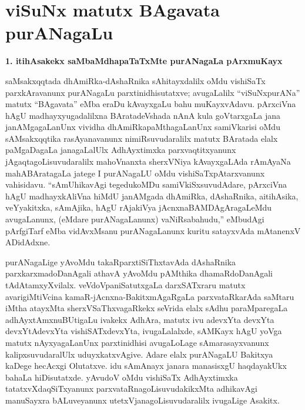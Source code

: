 \makeatletter
\def\@makechapterhead#1{%
  \vspace*{10\p@}%
{\fontsize{13pt}{13pt}\selectfont\raggedright{\bf  e. ke. bAyxnajiR}\par}
\vspace*{25\p@}%
  {\parindent \z@ \centering \normalfont
    \ifnum \c@secnumdepth >\m@ne
      \if@mainmatter
        {\huge\bfseries  #1}\par\nobreak
	\vskip 4pt
      \fi
    \fi
\smallskip 

 \vskip 10\p@  
{\fontsize{12pt}{12pt}\selectfont\raggedleft{anu: \bf pu.ti.na.}\par}
  }
\vskip 40\p@}
\makeatother

\chapter{viSuNx matutx BAgavata purANagaLu}\label{chap005}

\begin{center}
{\Large\bf 1. itihAsakekx saMbaMdhapaTaTxMte purANagaLa pArxmuKayx}
\end{center}

saMsakxqqtada dhAmiRka-dAshaRnika sAhitayxdalilx oMdu vishiSaTx parxkAravanunx purANa\-gaLu parxtinidhisutatxve; avugaLalilx ``viSuNxpurANa'' matutx ``BAgavata'' eMba eraDu kAvayx\-gaLu bahu muKayxvAdavu. pArxciVna hAgU madhayxyugadalilxna BAratadeVshada nAnA kula goVtarxgaLa jana janAMgagaLanUnx vividha dhAmiRkapaMthagaLanUnx samiVkarisi oMdu sAMsakxqqtika rasAyanavanunx nimiRsuvudaralilx matutx BAratada elalx paMgaDagaLa jana\-gaLalUlx AdhAyxtimxka parxvaqtitxyanunx jAgaqtagoLisuvudaralilx mahoVnanxta sherxVNiya kAvayx\-gaLAda rAmAyaNa mahABAratagaLa jatege I purANagaLU oMdu vishiSaTxpAtarxvanunx vahisidavu. ``sAmUhikavAgi tegedukoMDu samiVkiSxsuvudAdare, pArxciVna hAgU madhayxkAliVna hiMdU janAMgada dhAmiRka, dAshaRnika, aitihAsika, veYyakitxka, sAmAjika, hAgU rAjakiVya jAcnxnaBAMDAgAragaLeMdu avugaLanunx, (eMdare purANagaLanunx) vaNiRsabahudu,'' eMbudAgi pArfgiTarf eMba vidAvxMsanu purANagaLanunx kuritu satayxvAda mAtanenxV ADidAdxne.

purANagaLige yAvoMdu takaRparxtiSiThxtavAda dAshaRnika parxkarxmadoDanAgali athavA yAvoMdu pAMthika dhamaRdoDanAgali tAdAtamxyXvilalx. veVdoVpaniSatutx\-gaLa darxSATxraru matutx avarigiMtiVcina kamaR-jAcnxna-BakitxmAgaRgaLa parxvataRkarAda saMta\-ru iMtha atayxMta sherxVSaThxvagaRkekx seVrida elalx sAdhu paraMparegaLa adhAyxtAmxnuBUti\-gaLu ivakekx AdhAra, matutx ivu adevxYta devxYta devxYtAdevxYta vishiSATxdevxYta, ivugaLalalxde, sAMKayx hAgU yoVga matutx nAyxyagaLanUnx parxtinidhisi avugaLoLage sAmarasayxvanunx kalipxsuvudaralUlx uduyxkatxvAgive. Adare elalx purANagaLU Bakitxya kaDege hecAcxgi Olutatxve. idu sAmAnayx janara manasisxgU haqdayakUkx bahaLa hiDisutatxde. yAvudoV oMdu vishiSaTx AdhAyxtimxka tatatxvXdaqSiTxyanunx parxvataRnagoLisuvudakikxMta adhikavAgi manuSayxra bALuveyanunx utetxVjanagoLisuvudaralilx ivugaLige Asakitx.

